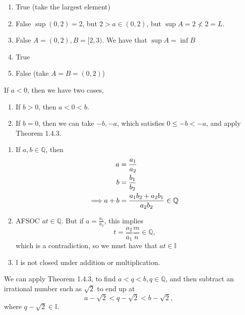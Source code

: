\begin{exercise}
\begin{enumerate}[label=(\alph*)]
	\item True (take the largest element)
	\item False $\sup (0, 2) = 2$, but $2 > a \in (0, 2)$, but $\sup A = 2 \not < 2 = L$.
	\item False $A = (0, 2), B = [2, 3)$. We have that $\sup A = \inf B$
	\item True
	\item False (take $A = B = (0, 2)$)
\end{enumerate}
\end{exercise}

\setcounter{subsection}{4}
\setcounter{exercise}{0}

\begin{exercise}
	If $a<0$, then we have two cases,
	\begin{enumerate}
		\item If $b > 0$, then $a < 0 < b$.
		\item If $b = 0$, then we can take $-b, -a$, which satisfies $0 \leq -b < -a$, and apply Theorem 1.4.3.
	\end{enumerate}
\end{exercise}

\begin{exercise}
\begin{enumerate}[label=(\alph*)]
	\item If $a, b \in \mathbb{Q}$, then 
	\begin{align*}
		a &= \frac{a_1}{a_2} \\
		b &= \frac{b_1}{b_2} \\
		\Longrightarrow a + b &= \frac{a_1b_2 + a_2b_1}{a_2b_2} \in \mathbb{Q}
	\end{align*}
	\item AFSOC $at \in \mathbb{Q}$. But if $a = \frac{a_1}{a_2}$, this implies
	\begin{equation*}
		t = \frac{a_2}{a_1}\frac{m}{n} \in \mathbb{Q},
	\end{equation*}
	which is a contradiction, so we must have that $at \in\mathbb{I}$
	\item $\mathbb{I}$ is not closed under addition or multiplication.
\end{enumerate}
\end{exercise}

\begin{exercise}
	We can apply Theorem 1.4.3, to find $a < q < b, q \in \mathbb{Q}$, and then subtract an irrational number such as $\sqrt{2}$ to end up at 
	\begin{equation}
		a - \sqrt{2} < q - \sqrt{2} < b - \sqrt{2},
	\end{equation}
	where $q- \sqrt{2} \in \mathbb{I}$.
\end{exercise}

